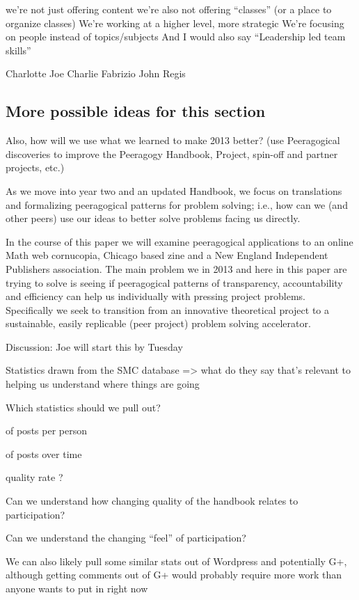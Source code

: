\documentclass{acm_proc_article-sp}
\begin{document}
we're not just offering content
we're also not offering ``classes'' (or a place to organize classes)
We're working at a higher level, more strategic
We're focusing on people instead of topics/subjects
And I would also say ``Leadership led team skills''

Charlotte
Joe
Charlie
Fabrizio
John
Regis

\subsection{More possible ideas for this section}

Also, how will we use what we learned to make 2013 better? (use
Peeragogical discoveries to improve the Peeragogy Handbook, Project,
spin-off and partner projects, etc.)

As we move into year two and an updated Handbook, we focus on translations and formalizing peeragogical patterns for problem solving; i.e., how can we (and other peers) use our ideas to better solve problems facing us directly.

In the course of this paper we will examine peeragogical applications to an online Math web cornucopia, Chicago based zine and a New England Independent Publishers association. The main problem we in 2013 and here in this paper are trying to solve is seeing if peeragogical patterns of transparency, accountability and efficiency can help us individually with pressing project problems. Specifically we seek to transition from an innovative theoretical project to a sustainable, easily replicable (peer project) problem solving accelerator.

Discussion: Joe will start this by Tuesday

    Statistics drawn from the SMC database => what do they say that's relevant to helping us understand where things are going

        Which statistics should we pull out?

             of posts per person

             of posts over time

             quality rate ?

                Can we understand how changing quality of the handbook relates to participation?

                Can we understand the changing ``feel'' of participation?

        We can also likely pull some similar stats out of Wordpress and potentially G+, although getting comments out of G+ would probably require more work than anyone wants to put in right now
\end{document}
